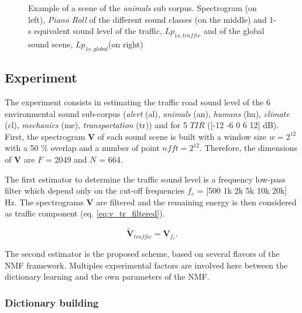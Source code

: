 \documentclass[twocolumn,a4paper,10pt]{article}
\begin{document}
\begin{figure}
\begin{minipage}[c]{.32\linewidth}
   \end{minipage}
\caption{Example of a scene of the \textit{animals} sub corpus. Spectrogram (on left), \textit{Piano Roll} of the different sound classes (on the middle) and 1-s equivalent sound level of the traffic, $Lp_{1s,traffic}$ and of the global sound scene, $Lp_{1s,global}$(on right)}
\label{fig:exampleScene}
\end{figure}

\subsection{Experiment}

The experiment consists in estimating the traffic road sound level of the 6 environmental sound sub-corpus (\textit{alert} (al), \textit{animals} (an), \textit{humans} (hu), \textit{climate} (cl), \textit{mechanics} (me), \textit{transportation} (tr)) and for 5 $TIR$ ([-12 -6 0 6 12] dB). First, the spectrogram $\mathbf{V}$ of each sound scene is built with a window size $w = 2^{12}$ with a 50 $\%$ overlap and a number of point $nfft = 2^{12}$. Therefore, the dimensions of $\mathbf{V}$ are $F$ = 2049 and $N$ = 664.

The first estimator to determine the traffic sound level is a frequency low-pass filter which depend only on the cut-off frequencies $f_c$ = [500 1k 2k 5k 10k 20k] Hz. The spectrograms $\mathbf{V}$ are filtered and the remaining energy is then considered as traffic component (eq. \ref{eq:v_tr_filtered}).

\begin{equation}\label{eq:v_tr_filtered}
\mathbf{\tilde{V}}_{traffic} = \mathbf{V}_{f_c}.
\end{equation}

The second estimator is the proposed scheme, based on several flavors of the NMF framework. Multiples experimental factors are involved here between the dictionary learning and the own parameters of the NMF.

\subsubsection{Dictionary building}\label{part:dictionary_learning}
\end{document}
